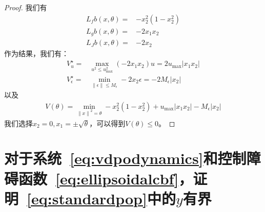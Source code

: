 \begin{proof}
  我们有
  \begin{subequations}
    \begin{eqnarray}
      L_fb(x, \theta) =& -x_2^2 (1 - x_2^2) \\
      L_gb(x, \theta) =& -2x_1 x_2 \\
      L_Jb(x, \theta) =& -2x_2
    \end{eqnarray}
  \end{subequations}
  作为结果，我们有：
  \begin{subequations}
    \begin{eqnarray}
      V_u^\star =& \displaystyle \max_{u^2 \le u_{\max}^2} (-2 x_1 x_2) u 
      = 2 u_{\max} |x_1 x_2| \\
      V_\epsilon^\star =& \displaystyle \min_{
        \left\lVert \epsilon \right\rVert \le M_\epsilon
      } -2 x_2 \epsilon 
      = -2 M_\epsilon |x_2|
    \end{eqnarray}
  \end{subequations}
  以及
  \begin{eqnarray}
    V(\theta) = \min_{\left\lVert x \right\rVert^2 = \theta} 
    -x_2^2 (1 - x_2^2) + u_{\max} |x_1 x_2| - M_\epsilon |x_2|
  \end{eqnarray}
  我们选择$x_2 = 0, x_1 = \pm \sqrt{\theta}$，可以得到$V(\theta) \le 0$。
\end{proof}

\section{对于系统~\eqref{eq:vdpodynamics}和控制障碍函数~\eqref{eq:ellipsoidalcbf}，证明~\eqref{eq:standardpop}中的$y$有界}
\label{app:bound:y:uncertainvdp}

